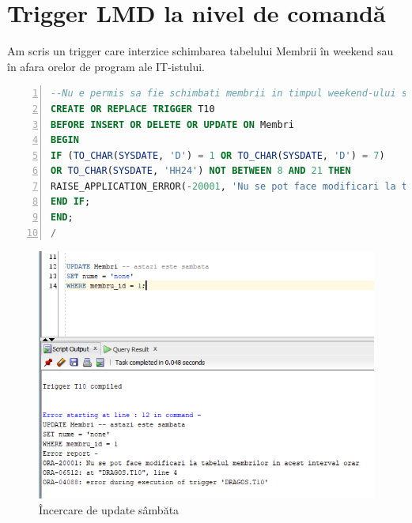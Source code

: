 \documentclass[12pt]{article}
\begin{document}
\section{Trigger LMD la nivel de comandă}
Am scris un trigger care interzice schimbarea tabelului Membrii în weekend sau în afara orelor de program ale IT-istului.\\
\begin{lstlisting}[language=SQL,
	showspaces=false,
	basicstyle=\ttfamily,
	numbers=left,
	numberstyle=\tiny,
	breaklines=true,
	commentstyle=\color{gray}]
--Nu e permis sa fie schimbati membrii in timpul weekend-ului sau in afara orelor de program.
CREATE OR REPLACE TRIGGER T10 
BEFORE INSERT OR DELETE OR UPDATE ON Membri
BEGIN
IF (TO_CHAR(SYSDATE, 'D') = 1 OR TO_CHAR(SYSDATE, 'D') = 7)
OR TO_CHAR(SYSDATE, 'HH24') NOT BETWEEN 8 AND 21 THEN
RAISE_APPLICATION_ERROR(-20001, 'Nu se pot face modificari la tabelul membrilor in acest interval orar');
END IF;
END;
/
\end{lstlisting}
\begin{figure}[!htb]
\includegraphics[max width=\linewidth]{imgs/ex10.png}
\caption{Încercare de update sâmbăta}
\label{fig:ex10}
\end{figure}
\end{document}
